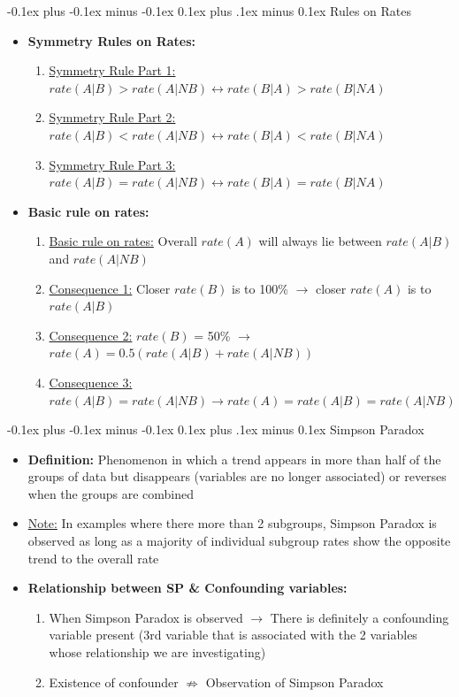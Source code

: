 \documentclass[landscape]{article}
\makeatletter
\renewcommand{\subsection}{\@startsection{subsection}{2}{0mm}%
  {-0.1ex plus -0.1ex minus -0.1ex}%
  {0.1ex plus .1ex minus 0.1ex}%
{\normalfont\scriptsize\bfseries}}
\makeatother
\begin{document}
\begin{multicols*}{5}
    \subsection{Rules on Rates}
    \begin{itemize}
      \item \textbf{Symmetry Rules on Rates:}
      \begin{enumerate}
        \item \underline{Symmetry Rule Part 1:} $rate(A|B) > rate(A|NB) \leftrightarrow rate(B|A) > rate(B|NA)$
        \item \underline{Symmetry Rule Part 2:} $rate(A|B) < rate(A|NB) \leftrightarrow rate(B|A) < rate(B|NA)$
        \item \underline{Symmetry Rule Part 3:} $rate(A|B) = rate(A|NB) \leftrightarrow rate(B|A) = rate(B|NA)$
      \end{enumerate}
      \item \textbf{Basic rule on rates:}
      \begin{enumerate}
        \item \underline{Basic rule on rates:} Overall $rate(A)$ will always lie between $rate(A|B)$ and $rate(A|NB)$
        \item \underline{Consequence 1:} Closer $rate(B)$ is to 100\% $\rightarrow$ closer $rate(A)$ is to $rate(A|B)$
        \item \underline{Consequence 2:} $rate(B)$ = 50\% $\rightarrow$ $rate(A) = 0.5(rate(A|B) + rate(A|NB))$
        \item \underline{Consequence 3:} $rate(A|B) = rate(A|NB) \rightarrow rate(A) = rate(A|B) = rate(A|NB)$ 
      \end{enumerate}
    \end{itemize}

    \subsection{Simpson Paradox}
    \begin{itemize}
      \item \textbf{Definition:} Phenomenon in which a trend appears in more than half of the groups of data but disappears (variables are no longer associated) or reverses when the groups are combined
      \item \underline{Note:} In examples where there more than 2 subgroups, Simpson Paradox is observed as long as a majority of individual subgroup rates show the opposite trend to the overall rate
      \item \textbf{Relationship between SP \& Confounding variables:} 
      \begin{enumerate}
        \item When Simpson Paradox is observed $\rightarrow$ There is definitely a confounding variable present (3rd variable that is associated with the 2 variables whose relationship we are investigating)
        \item Existence of confounder $\nRightarrow$ Observation of Simpson Paradox
      \end{enumerate}
    \end{itemize}


\end{multicols*}
\end{document}
